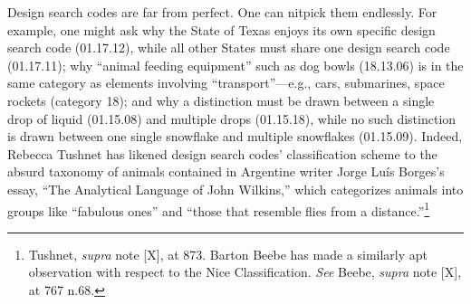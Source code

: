 \documentclass[letterpaper, 11pt, oneside]{article}
\begin{document}
Design search codes are far from perfect. One can nitpick them endlessly. For example, one might ask why the State of Texas enjoys its own specific design search code (01.17.12), while all other States must share one design search code (01.17.11); why ``animal feeding equipment'' such as dog bowls (18.13.06) is in the same category as elements involving ``transport''—e.g., cars, submarines, space rockets (category 18); and why a distinction must be drawn between a single drop of liquid (01.15.08) and multiple drops (01.15.18), while no such distinction is drawn between one single snowflake and multiple snowflakes (01.15.09). Indeed, Rebecca Tushnet has likened design search codes' classification scheme to the absurd taxonomy of animals contained in Argentine writer Jorge Luís Borges's essay, ``The Analytical Language of John Wilkins,'' which categorizes animals into groups like ``fabulous ones'' and ``those that resemble flies from a distance.''\footnote{Tushnet, \textit{supra} note [X], at 873. Barton Beebe has made a similarly apt observation with respect to the Nice Classification. \textit{See} Beebe, \textit{supra} note [X], at 767 n.68.}
\end{document}
